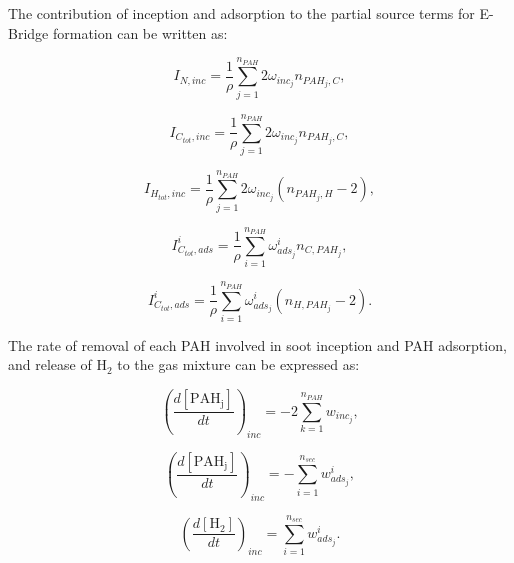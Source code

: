 The contribution of inception and adsorption to the partial source terms for E-Bridge formation can be written as:

\begin{equation}
	I_{N,{inc}} = \frac{1}{\rho}
	\sum_{j=1}^{n_{PAH}}
	2\omega_{inc_{j}} 
	n_{PAH_j,C}
	\label{eqn:IN_inc_ebri},
\end{equation}

\begin{equation}
	I_{C_{tot},{inc}} = \frac{1}{\rho}
	\sum_{j=1}^{n_{PAH}}
	2\omega_{inc_{j}} 
	n_{PAH_j,C}
	\label{eqn:ICtot_inc_ebri},
\end{equation}

\begin{equation}
	I_{H_{tot},{inc}} = \frac{1}{\rho}
	\sum_{j=1}^{n_{PAH}}
	2\omega_{inc_{j}} 
	\left(
	n_{PAH_j,H}-2
	\right)
	\label{eqn:IHtot_inc_ebri},
\end{equation}

\begin{equation}
	I^i_{C_{tot},ads} =
	\frac{1}{\rho}
	\sum_{i=1}^{n_{PAH}}
	\omega^i_{ads_j}
	n_{C,PAH_j}
	\label{eqn:ICtotads_ebri},
\end{equation}

\begin{equation}
	I^i_{C_{tot},ads} =
	\frac{1}{\rho}
	\sum_{i=1}^{n_{PAH}}
	\omega^i_{ads_j}
	\left(n_{H,PAH_j}-2\right)
	\label{eqn:IHtotads_ebri}.
\end{equation}

The rate of removal of each PAH involved in soot inception and PAH adsorption, and release of $\mathrm{H_2}$ to the gas mixture can be expressed as:

\begin{equation}
	\left(
	\frac{d\left[{\mathrm{PAH_j}}\right]}{dt}
	\right)_{inc}
	= 
	-2\sum_{k=1}^{n_{PAH}}w_{inc_{j}},
\end{equation}

\begin{equation}
	\left(
	\frac{d\left[{\mathrm{PAH_j}}\right]}{dt}
	\right)_{inc}
	= 
	-\sum_{i=1}^{n_{sec}}w^i_{ads_j},
	\label{eqn:PAHscrub_ebri_ads}
\end{equation}

\begin{equation}
	\left(
	\frac{d\left[{\mathrm{H_2}}\right]}{dt}
	\right)_{inc}
	= 
	\sum_{i=1}^{n_{sec}}w^i_{ads_j}.
	\label{eqn:H2scrub_ebri}
\end{equation}